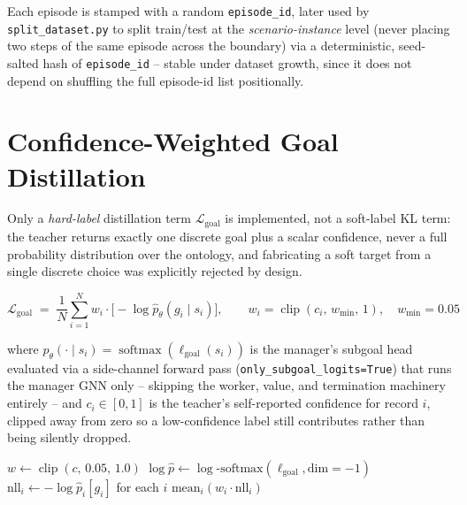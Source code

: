 \documentclass[11pt]{article}
\newcommand{\code}[1]{\texttt{#1}}
\begin{document}
Each episode is stamped with a random \code{episode\_id}, later used by
\code{split\_dataset.py} to split train/test at the \emph{scenario-instance} level
(never placing two steps of the same episode across the boundary) via a
deterministic, seed-salted hash of \code{episode\_id} -- stable under dataset growth,
since it does not depend on shuffling the full episode-id list positionally.

\section{Confidence-Weighted Goal Distillation}
\label{sec:distill}

Only a \emph{hard-label} distillation term $\mathcal{L}_{\text{goal}}$ is implemented,
not a soft-label KL term: the teacher returns exactly one discrete goal plus a scalar
confidence, never a full probability distribution over the ontology, and fabricating
a soft target from a single discrete choice was explicitly rejected by design.

\begin{equation}
\mathcal{L}_{\text{goal}} \;=\; \frac{1}{N}\sum_{i=1}^{N} w_i \cdot \big[-\log
  \hat p_{\theta}(g_i \mid s_i)\big], \qquad
  w_i = \operatorname{clip}(c_i,\, w_{\min},\, 1), \quad w_{\min}=0.05
\label{eq:distill-loss}
\end{equation}

where $\hat p_\theta(\cdot \mid s_i) = \operatorname{softmax}(\ell_{\text{goal}}(s_i))$
is the manager's subgoal head evaluated via a side-channel forward pass
(\code{only\_subgoal\_logits=True}) that runs the manager GNN only -- skipping the
worker, value, and termination machinery entirely -- and $c_i \in [0,1]$ is the
teacher's self-reported confidence for record $i$, clipped away from zero so a
low-confidence label still contributes rather than being silently dropped.

\begin{algorithm}[H]
\caption{Confidence-Weighted Goal Distillation Loss}
\label{alg:distill}
\begin{algorithmic}[1]
  \State $w \gets \operatorname{clip}(c,\, 0.05,\, 1.0)$
  \State $\log \hat p \gets \log\text{-softmax}(\ell_{\text{goal}}, \text{dim}=-1)$
  \State $\text{nll}_i \gets -\log \hat p_i[g_i]$ for each $i$
  \State \Return $\text{mean}_i ( w_i \cdot \text{nll}_i )$
\EndFunction
\end{algorithmic}
\end{algorithm}
\end{document}
